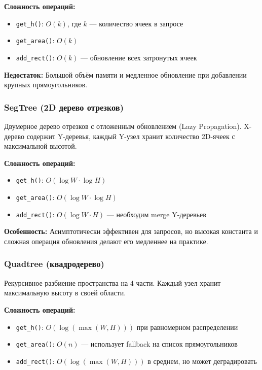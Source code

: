 \textbf{Сложность операций:}
\begin{itemize}
    \item \texttt{get\_h()}: $O(k)$, где $k$ --- количество ячеек в запросе
    \item \texttt{get\_area()}: $O(k)$
    \item \texttt{add\_rect()}: $O(k)$ --- обновление всех затронутых ячеек
\end{itemize}

\textbf{Недостаток:} Большой объём памяти и медленное обновление при добавлении крупных прямоугольников.

\subsubsection{SegTree (2D дерево отрезков)}

Двумерное дерево отрезков с отложенным обновлением (Lazy Propagation). X-дерево содержит Y-деревья, каждый Y-узел хранит количество 2D-ячеек с максимальной высотой.

\textbf{Сложность операций:}
\begin{itemize}
    \item \texttt{get\_h()}: $O(\log W \cdot \log H)$
    \item \texttt{get\_area()}: $O(\log W \cdot \log H)$
    \item \texttt{add\_rect()}: $O(\log W \cdot H)$ --- необходим merge Y-деревьев
\end{itemize}

\textbf{Особенность:} Асимптотически эффективен для запросов, но высокая константа и сложная операция обновления делают его медленнее на практике.

\subsubsection{Quadtree (квадродерево)}

Рекурсивное разбиение пространства на 4 части. Каждый узел хранит максимальную высоту в своей области.

\textbf{Сложность операций:}
\begin{itemize}
    \item \texttt{get\_h()}: $O(\log(\max(W,H)))$ при равномерном распределении
    \item \texttt{get\_area()}: $O(n)$ --- использует fallback на список прямоугольников
    \item \texttt{add\_rect()}: $O(\log(\max(W,H)))$ в среднем, но может деградировать
\end{itemize}

